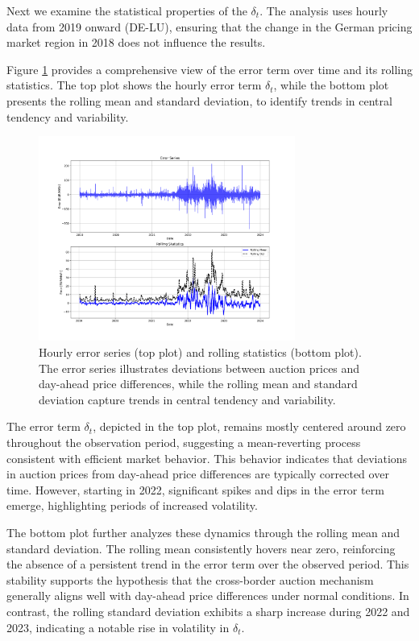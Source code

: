 \documentclass[12pt]{article}
\begin{document}
Next we examine the statistical properties of the $\delta_t$. The analysis uses hourly data from 2019 onward (DE-LU), ensuring that the change in the German pricing market region in 2018 does not influence the results.

Figure \ref{fig:error_series} provides a comprehensive view of the error term over time and its rolling statistics. The top plot shows the hourly error term $\delta_t$, while the bottom plot presents the rolling mean and standard deviation, to identify trends in central tendency and variability.

\begin{figure}[ht]
    \centering
    \includegraphics[width=0.75\textwidth]{figures/error_series.png}
    \caption{Hourly error series (top plot) and rolling statistics (bottom plot). The error series illustrates deviations between auction prices and day-ahead price differences, while the rolling mean and standard deviation capture trends in central tendency and variability.}
    \label{fig:error_series}
\end{figure}

The error term $\delta_t$, depicted in the top plot, remains mostly centered around zero throughout the observation period, suggesting a mean-reverting process consistent with efficient market behavior. This behavior indicates that deviations in auction prices from day-ahead price differences are typically corrected over time. However, starting in 2022, significant spikes and dips in the error term emerge, highlighting periods of increased volatility.

The bottom plot further analyzes these dynamics through the rolling mean and standard deviation. The rolling mean consistently hovers near zero, reinforcing the absence of a persistent trend in the error term over the observed period. This stability supports the hypothesis that the cross-border auction mechanism generally aligns well with day-ahead price differences under normal conditions. In contrast, the rolling standard deviation exhibits a sharp increase during 2022 and 2023, indicating a notable rise in volatility in $\delta_t$.
\end{document}
